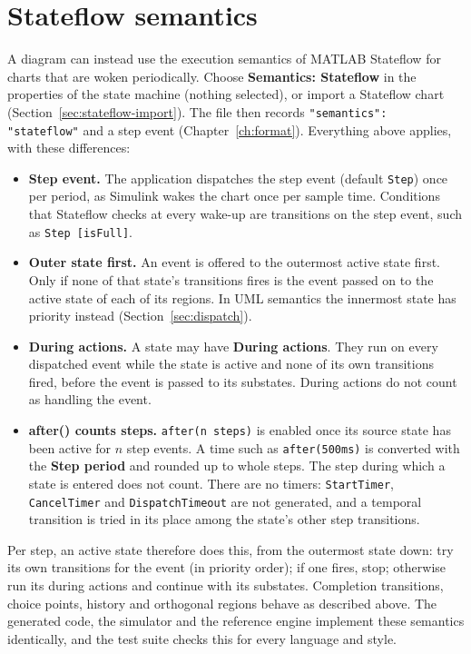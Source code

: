 \documentclass[11pt,a4paper,openany]{report}
\newcommand{\ui}[1]{\textsf{\textbf{#1}}}
\newcommand{\code}[1]{\texttt{#1}}
\begin{document}
\section{Stateflow semantics}
\label{sec:stateflow-semantics}
A diagram can instead use the execution semantics of MATLAB Stateflow for charts that are woken
periodically. Choose \ui{Semantics: Stateflow} in the properties of the state machine (nothing
selected), or import a Stateflow chart (Section~\ref{sec:stateflow-import}). The file then records
\code{"semantics": "stateflow"} and a step event (Chapter~\ref{ch:format}). Everything above applies,
with these differences:
\begin{itemize}
  \item \textbf{Step event.} The application dispatches the step event (default \code{Step}) once per
        period, as Simulink wakes the chart once per sample time. Conditions that Stateflow checks at
        every wake-up are transitions on the step event, such as \code{Step [isFull]}.
  \item \textbf{Outer state first.} An event is offered to the outermost active state first. Only if
        none of that state's transitions fires is the event passed on to the active state of each of
        its regions. In UML semantics the innermost state has priority instead
        (Section~\ref{sec:dispatch}).
  \item \textbf{During actions.} A state may have \ui{During actions}. They run on every dispatched
        event while the state is active and none of its own transitions fired, before the event is
        passed to its substates. During actions do not count as handling the event.
  \item \textbf{after() counts steps.} \code{after(n steps)} is enabled once its source state has been
        active for \(n\) step events. A time such as \code{after(500ms)} is converted with the
        \ui{Step period} and rounded up to whole steps. The step during which a state is entered does
        not count. There are no timers: \code{StartTimer}, \code{CancelTimer} and \code{DispatchTimeout}
        are not generated, and a temporal transition is tried in its place among the state's other step
        transitions.
\end{itemize}
Per step, an active state therefore does this, from the outermost state down: try its own transitions
for the event (in priority order); if one fires, stop; otherwise run its during actions and continue with
its substates. Completion transitions, choice points, history and orthogonal regions behave as described
above. The generated code, the simulator and the reference engine implement these semantics
identically, and the test suite checks this for every language and style.
\end{document}
